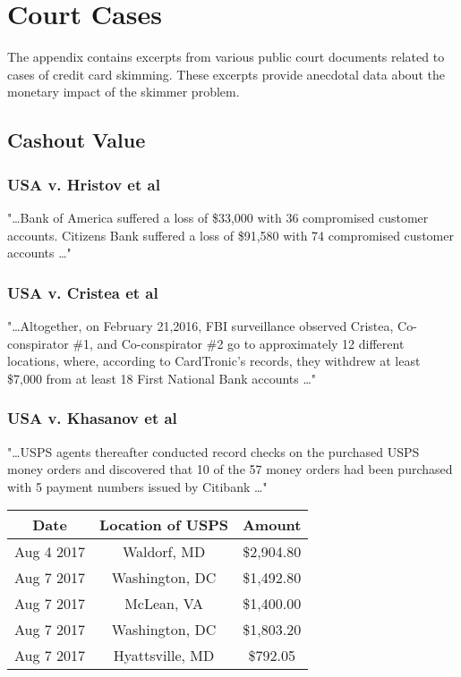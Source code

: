 
\section{Court Cases}
\label{sec:appendix}

The appendix contains excerpts from various public court documents related to cases of credit card skimming. These excerpts provide anecdotal data about the monetary impact of the skimmer problem.

\subsection{Cashout Value}
\label{sec:appendix:cashout}

\subsubsection*{USA v. Hristov et al \cite{hristov}}
"\dots Bank of America suffered a loss of \$33,000 with 36
compromised customer accounts.  Citizens Bank suffered a loss of
\$91,580 with 74 compromised customer accounts \dots" 

\subsubsection*{USA v. Cristea et al \cite{cristea}}
"\dots Altogether, on February 21,2016, FBI surveillance observed Cristea, 
Co-conspirator \#1, and Co-conspirator \#2 go to approximately 12 
different locations, where, according to CardTronic's records, they
withdrew at least \$7,000 from at least 18 First National Bank accounts \dots" 

\subsubsection*{USA v. Khasanov et al \cite{mekhakian}}
"\dots USPS agents thereafter conducted record checks on the purchased USPS money orders
and discovered that 10 of the 57 money orders had been purchased with 5 payment numbers
issued by Citibank \dots"

\begin{center}
    \begin{tabular}{|c|c|c|}
    	\hline
        \textbf{Date} & \textbf{Location of USPS} & \textbf{Amount} \\ 
        \hline 
        Aug 4 2017 & Waldorf, MD & \$2,904.80 \\
        \hline
        Aug 7 2017 & Washington, DC & \$1,492.80 \\
        \hline
        Aug 7 2017 & McLean, VA & \$1,400.00 \\
        \hline
        Aug 7 2017 & Washington, DC & \$1,803.20 \\
        \hline
        Aug 7 2017 & Hyattsville, MD & \$792.05 \\
    	\hline
    \end{tabular}
\end{center}
 

